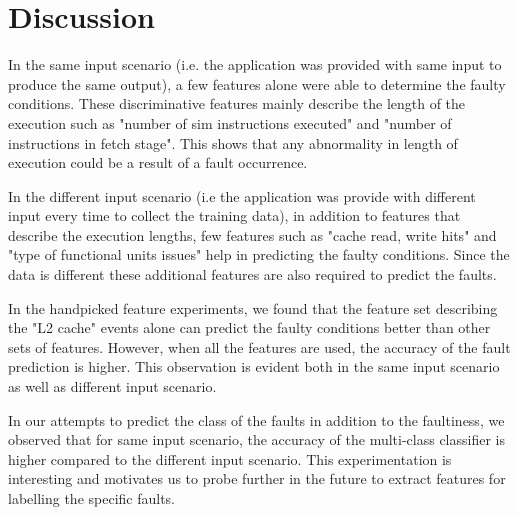 \section{Discussion}
In the same input scenario (i.e. the application was provided with same input to produce the same output), a few features alone were able to determine the faulty conditions. These discriminative features mainly describe the length of the execution such as "number of sim instructions executed" and "number of instructions in fetch stage". This shows that any abnormality in length of execution could be a result of a fault occurrence. 

In the different input scenario (i.e the application was provide with different input every time to collect the training data), in addition to features that describe the execution lengths, few features such as "cache read, write hits" and "type of functional units issues" help in predicting the faulty conditions. Since the data is different these additional features are also required to predict the faults. 

In the handpicked feature experiments, we found that the feature set describing the "L2 cache" events alone can predict the faulty conditions better than other sets of features. However, when all the features are used, the accuracy of the fault prediction is higher. This observation is evident both in the same input scenario as well as different input scenario. 

In our attempts to predict the class of the faults in addition to the faultiness, we observed that for same input scenario, the accuracy of the multi-class classifier is higher compared to the different input scenario. This experimentation is interesting and motivates us to probe further in the future to extract features for labelling the specific faults.

\vspace{1em}	
